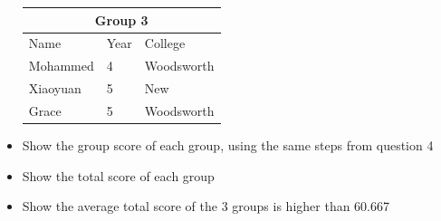 \documentclass[12pt]{article}
\begin{document}
\begin{mdframed}
\begin{itemize}
\begin{mdframed}
\begin{center}
            \bigskip

            \begin{tabular}{|p{2.5cm}|p{2.5cm}|p{2.5cm}|}
                \hline
                \multicolumn{3}{|c|}{\textbf{Group 3}}\\
                \hline
                Name & Year & College\\
                \hline
                Mohammed & 4 & Woodsworth\\
                \hline
                Xiaoyuan & 5 & New\\
                \hline
                Grace & 5 & Woodsworth\\
                \hline
            \end{tabular}
        \end{center}


        \end{mdframed}
        \item Show the group score of each group, using the same steps from
        question 4
        \item Show the total score of each group
        \item Show the average total score of the 3 groups is higher than
        60.667
    \end{itemize}


\end{mdframed}
\end{document}

